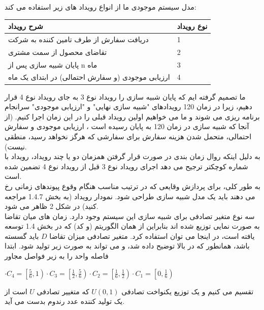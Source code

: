 \documentclass[12pt,a4paper]{report}
\begin{document}
\label{section:logic}
مدل سیستم موجودی ما از انواع رویداد های زیر استفاده می کند:\\

\begin{center}
	\begin{tabular}{ | m{20em} | m{2cm}| } 
		\hline
		شرح رویداد & نوع رویداد \\ 
		\hline
		دریافت سفارش از طرف تامین کننده به شرکت & 1\\
		\hline
		تقاضای محصول از سمت مشتری & 2 \\
		\hline
		پایان شبیه سازی پس از n ماه & 3 \\
		\hline
		ارزیابی موجودی (و سفارش احتمالی) در ابتدای یک ماه & 4 \\
		\hline
	\end{tabular}
\end{center}
ما تصمیم گرفته ایم که پایان شبیه سازی را رویداد نوع 3 به جای رویداد نوع 4 قرار دهیم، زیرا در زمان 120 رویدادهای "شبیه سازی نهایی" و "ارزیابی موجودی" سرانجام برنامه ریزی می شوند و ما می خواهیم اولین رویداد قبلی را در این زمان اجرا کنیم. (از آنجا که شبیه سازی در زمان 120 به پایان رسیده است ، ارزیابی موجودی و سفارش احتمالی، متحمل شدن هزینه سفارش برای سفارشی که هرگز نخواهد رسید، منطقی نیست). \\
به دلیل اینکه روال زمان بندی در صورت قرار گرفتن همزمان دو یا چند رویداد، رویداد با شماره کوچکتر ترجیح می دهد اجرای رویداد نوع 3 قبل از رویداد نوع 4 تضمین شده است.\\
به طور کلی، برای پردازش وقایعی که در ترتیب مناسب هنگام وقوع پیوندهای زمانی رخ می دهند باید یک مدل شبیه سازی طراحی شود.
نمودار رویداد (به بخش 1.4.7 مراجعه کنید) در شکل 2 ظاهر می شود.
\\

سه نوع متغیر تصادفی برای شبیه سازی این سیستم وجود دارد. زمان های میان تقاضا به صورت نمایی توزیع شده اند بنابراین از همان الگوریتم (و کد) که در بخش 1.4 توسعه یافته است، در اینجا می توان استفاده کرد. متغیر تصادفی میزان تقاضا
$D$
باید گسسته باشد، همانطور که در بالا توضیح داده شد، و می تواند به صورت زیر تولید شود. ابتدا فاصله واحد را به زیر فواصل مجاور

$\cdot C_{4}=\left[\frac{5}{6}, 1\right) \cdot C_{3}=\left[\frac{1}{2}, \frac{5}{6}\right) \cdot C_{2}=\left[\frac{1}{6}, \frac{1}{2}\right) \cdot C_{1}=\left[0, \frac{1}{6}\right)$

تقسیم می کنیم و یک توزیع یکنواخت تصادفی
$ U(0,1) $
که متغییر تصادفی
$ U $
است از یک تولید کننده عدد رندوم بدست می آید.
\end{document}
